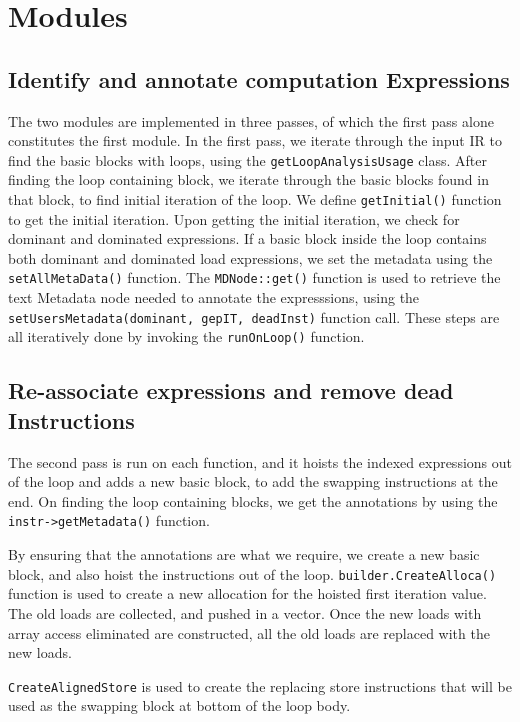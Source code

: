 \section{Modules}
\subsection{Identify and annotate computation Expressions}
The two modules are implemented in three passes, of which the first pass alone constitutes the first module. In the first pass, we iterate through the input IR to find the basic blocks with loops, using the \texttt	{getLoopAnalysisUsage} class. After finding the loop containing block, we iterate through the basic blocks found in that block, to find initial iteration of the loop. We define \texttt{getInitial()} function to get the initial iteration. Upon getting the initial iteration, we check for dominant and dominated expressions. If a basic block inside the loop contains both dominant and dominated load expressions, we set the metadata using the 
\texttt{setAllMetaData()} function. The \texttt{MDNode::get()} function is used to retrieve the text Metadata node needed to annotate the expresssions, using the \texttt{ setUsersMetadata(dominant, gepIT, deadInst)} function call. These steps are all iteratively done by invoking the \texttt{runOnLoop()} function. 

\subsection{Re-associate expressions and remove dead Instructions}
The second pass is run on each function, and it hoists the indexed expressions out of the loop and adds a new basic block, to add the swapping instructions at the end. On finding the loop containing blocks, we get the annotations by using the \texttt{instr->getMetadata()} function. 

By ensuring that the annotations are what we require, we create a new basic block, and also hoist the instructions out of the loop. \texttt{builder.CreateAlloca()} function is used to create a new allocation for the hoisted first iteration value. The old loads are collected, and pushed in a vector. Once the new loads with array access eliminated are constructed, all the old loads are replaced with the new loads. 

\texttt{CreateAlignedStore} is used to create the replacing store instructions that will be used as the swapping block at bottom of the loop body. 

